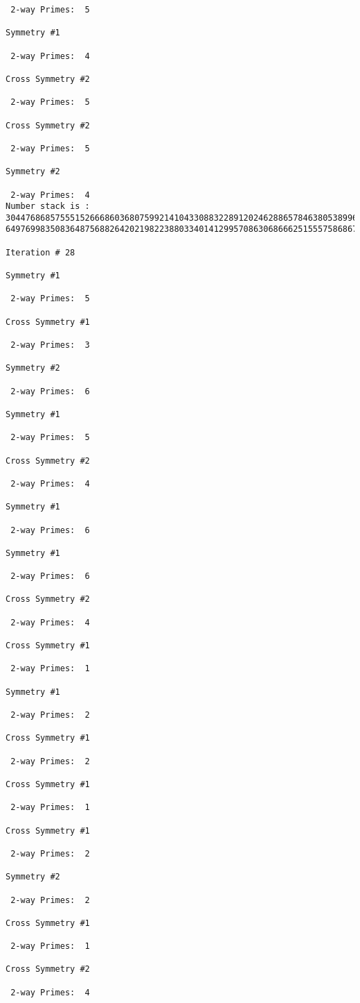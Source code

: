 {{{{\begin{verbatim}
 2-way Primes: 	5

Symmetry #1

 2-way Primes: 	4

Cross Symmetry #2

 2-way Primes: 	5

Cross Symmetry #2

 2-way Primes: 	5

Symmetry #2

 2-way Primes: 	4
Number stack is :
30447686857555152666860368075992141043308832289120246288657846380538996794608835958544046240163340857
64976998350836487568826420219822388033401412995708630686662515557586867440375804336104264044585953880

Iteration #	28

Symmetry #1

 2-way Primes: 	5

Cross Symmetry #1

 2-way Primes: 	3

Symmetry #2

 2-way Primes: 	6

Symmetry #1

 2-way Primes: 	5

Cross Symmetry #2

 2-way Primes: 	4

Symmetry #1

 2-way Primes: 	6

Symmetry #1

 2-way Primes: 	6

Cross Symmetry #2

 2-way Primes: 	4

Cross Symmetry #1

 2-way Primes: 	1

Symmetry #1

 2-way Primes: 	2

Cross Symmetry #1

 2-way Primes: 	2

Cross Symmetry #1

 2-way Primes: 	1

Cross Symmetry #1

 2-way Primes: 	2

Symmetry #2

 2-way Primes: 	2

Cross Symmetry #1

 2-way Primes: 	1

Cross Symmetry #2

 2-way Primes: 	4


\end{verbatim}}}}}
